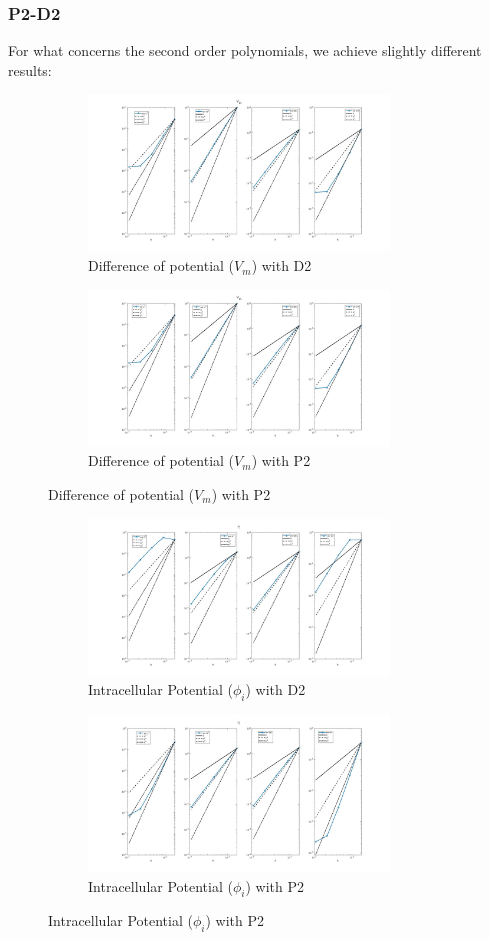 \documentclass[a4paper,11pt]{article}
\begin{document}
\subsubsection{P2-D2} \label{P2-D2}
\noindent  For what concerns the second order polynomials, we achieve slightly different results:

\begin{figure}[h]
\begin{subfigure}{0.5\textwidth}
\includegraphics[width = 8cm]{./D2_Vm_1.jpg}
\caption*{Difference of potential ($V_m$) with D2}
\label{Vm_D2}
\end{subfigure}
\begin{subfigure}{0.5\textwidth}
\includegraphics[width =8cm]{./P2_Vm_1.jpg}
\caption*{Difference of potential ($V_m$) with P2}
\label{Vm_P2}
\end{subfigure}
\end{figure}
\begin{figure}[h]
\begin{subfigure}{0.5\textwidth}
\includegraphics[width = 8cm]{./D2_Phii_1.jpg}
\caption*{Intracellular Potential ($\phi_i$) with D2}
\label{Phii_D2}
\end{subfigure}
\begin{subfigure}{0.5\textwidth}
\includegraphics[width =8cm]{./P2_Phii_1.jpg}
\caption*{Intracellular Potential ($\phi_i$) with P2}
\label{Phii_P2}
\end{subfigure}
\end{figure}
\end{document}
